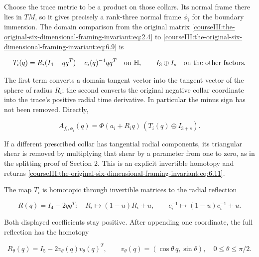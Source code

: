 Choose the trace metric to be a product on those collars. Its normal frame there lies in \(TM\), so it gives precisely a rank-three normal frame \(\phi_i\) for the boundary immersion. The domain comparison from the original matrix \eqref{courseIII:the-original-six-dimensional-framing-invariant:eq:2.4} to \eqref{courseIII:the-original-six-dimensional-framing-invariant:eq:6.9} is

\begin{equation}
T_i(q)=R_i(I_4-qq^T)-c_i(q)^{-1}qq^T
                   \quad\hbox{on }\mathbb H,
 \qquad I_3\oplus I_s\quad\hbox{on the other factors}.
 \label{courseIII:the-original-six-dimensional-framing-invariant:eq:6.10}
\end{equation}

The first term converts a domain tangent vector into the tangent vector of the sphere of radius \(R_i\); the second converts the original negative collar coordinate into the trace's positive radial time derivative. In particular the minus sign has not been removed. Directly,

\begin{equation}
A_{f_i,\phi_i}(q)
                     =\Phi(a_i+R_iq)\,(T_i(q)\oplus I_{3+s}).
 \label{courseIII:the-original-six-dimensional-framing-invariant:eq:6.11}
\end{equation}

If a different prescribed collar has tangential radial components, its triangular shear is removed by multiplying that shear by a parameter from one to zero, as in the splitting proof of Section 2. This is an explicit invertible homotopy and returns \eqref{courseIII:the-original-six-dimensional-framing-invariant:eq:6.11}.

The map \(T_i\) is homotopic through invertible matrices to the radial reflection

\begin{equation}
R(q)=I_4-2qq^T:
       \quad R_i\longmapsto(1-u)R_i+u,\qquad
       c_i^{-1}\longmapsto(1-u)c_i^{-1}+u.
 \label{courseIII:the-original-six-dimensional-framing-invariant:eq:6.12}
\end{equation}

Both displayed coefficients stay positive. After appending one coordinate, the full reflection has the homotopy

\begin{equation}
R_\theta(q)=I_5-2v_\theta(q)v_\theta(q)^T,\qquad
 v_\theta(q)=(\cos\theta\,q,\sin\theta),\quad
                 0\le\theta\le\pi/2.
 \label{courseIII:the-original-six-dimensional-framing-invariant:eq:6.13}
\end{equation}

